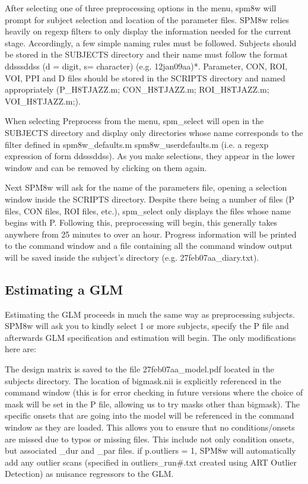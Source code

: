 \documentclass[12pt]{article}
\begin{document}
After selecting one of three preprocessing options in the menu, spm8w will prompt for subject selection and location of the parameter files. SPM8w relies heavily on regexp filters to only display the information needed for the current stage. Accordingly, a few simple naming rules must be followed. Subjects should be stored in the SUBJECTS directory and their name must follow the format ddsssddss (d = digit, s= character) (e.g. 12jan09aa)*. Parameter, CON, ROI, VOI, PPI and D files should be stored in the SCRIPTS directory and named appropriately (P\_H8TJAZZ.m; CON\_H8TJAZZ.m; ROI\_H8TJAZZ.m; VOI\_H8TJAZZ.m;). 

When selecting Preprocess from the menu, spm\_select will open in the SUBJECTS directory and display only directories whose name corresponds to the filter defined in spm8w\_defaults.m spm8w\_userdefaults.m (i.e. a regexp expression of form ddsssddss). As you make selections, they appear in the lower window and can be removed by clicking on them again. 

Next SPM8w will ask for the name of the parameters file, opening a selection window inside the SCRIPTS directory. Despite there being a number of files (P files, CON files, ROI files, etc.), spm\_select only displays the files whose name begins with P. Following this, preprocessing will begin, this generally takes anywhere from 25 minutes to over an hour. Progress information will be printed to the command window and a file containing all the command window output will be saved inside the subject’s directory (e.g. 27feb07aa\_diary.txt).


\subsection{Estimating a GLM}

Estimating the GLM proceeds in much the same way as preprocessing subjects. SPM8w will ask you to kindly select 1 or more subjects, specify the P file and afterwards GLM specification and estimation will begin. The only modifications here are:

The design matrix is saved to the file 27feb07aa\_model.pdf located in the subjects directory.
The location of bigmask.nii is explicitly referenced in the command window (this is for error checking in future versions where the choice of mask will be set in the P file, allowing us to try masks other than bigmask).  
The specific onsets that are going into the model will be referenced in the command window as they are loaded. This allows you to ensure that no conditions/onsets are missed due to typos or missing files. This include not only condition onsets, but associated \_dur and \_par files.
if p.outliers = 1, SPM8w will automatically add any outlier scans (specified in outliers\_run\#.txt created using ART Outlier Detection) as nuisance regressors to the GLM.  
\end{document}
